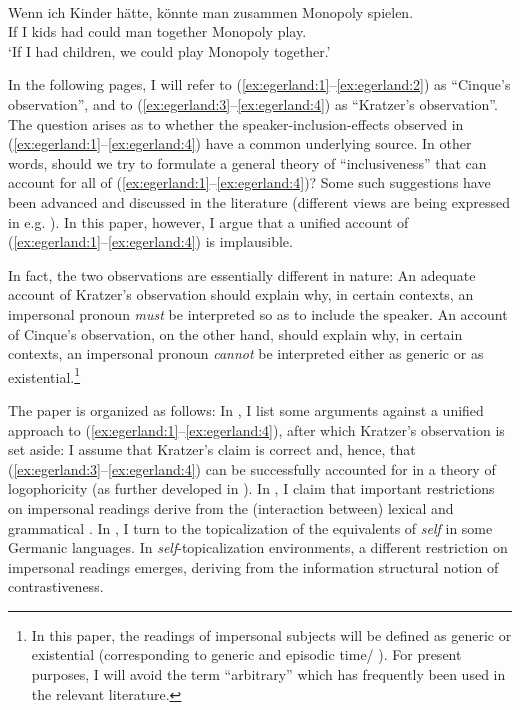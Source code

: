 \documentclass[output=paper]{LSP/langsci}
\begin{document}
\ea\label{ex:egerland:4}
\\
\gll Wenn  ich  Kinder  hätte,  könnte  man  zusammen  Monopoly  spielen.\\
      If      I    kids    had  could    man  together    Monopoly  play.\\
\glt ‘If I had children, we could play Monopoly together.’
\z

In the following pages, I will refer to (\ref{ex:egerland:1}--\ref{ex:egerland:2}) as “Cinque’s observation”, and to (\ref{ex:egerland:3}--\ref{ex:egerland:4}) as “Kratzer’s observation”. The question arises as to whether the speaker-inclusion-effects observed in (\ref{ex:egerland:1}--\ref{ex:egerland:4}) have a common underlying source. In other words, should we try to formulate a general theory of “inclusiveness” that can account for all of (\ref{ex:egerland:1}--\ref{ex:egerland:4})? Some such suggestions have been advanced and discussed in the literature (different views are being expressed in e.g. \citealt{DAlessandroAlexiadou2003,DAlessandro2007,Malamud2006,Zobel2011}). In this paper, however, I argue that a unified account of (\ref{ex:egerland:1}--\ref{ex:egerland:4}) is implausible.

In fact, the two observations are essentially different in nature: An adequate account of Kratzer’s observation should explain why, in certain contexts, an impersonal pronoun \textit{must} be interpreted so as to include the speaker. An account of Cinque’s observation, on the other hand, should explain why, in certain contexts, an impersonal pronoun \textit{cannot} be interpreted either as generic or as existential.\footnote{In this paper, the readings of impersonal subjects will be defined as generic or existential (corresponding to generic and episodic time/ ). For present purposes, I will avoid the term “arbitrary” which has frequently been used in the relevant literature.}

The paper is organized as follows: In , I list some arguments against a unified approach to (\ref{ex:egerland:1}--\ref{ex:egerland:4}), after which Kratzer’s observation is set aside: I assume that Kratzer’s claim is correct and, hence, that (\ref{ex:egerland:3}--\ref{ex:egerland:4}) can be successfully accounted for in a theory of logophoricity (as further developed in \citealt{Kratzer2009}). In , I claim that important restrictions on impersonal readings derive from the (interaction between) lexical and grammatical . In , I turn to the topicalization of the equivalents of \textit{self} in some Germanic languages. In \textit{self}-topicalization environments, a different restriction on impersonal readings emerges, deriving from the information structural notion of contrastiveness.
\end{document}
